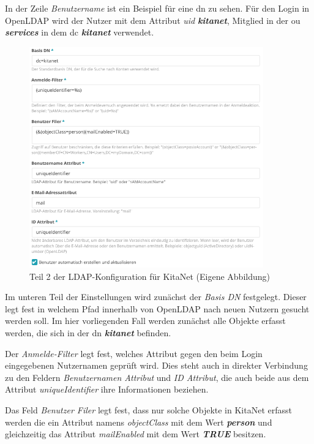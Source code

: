In der Zeile \textit{Benutzername} ist ein Beispiel für eine \ac{dn} zu sehen. Für den Login in OpenLDAP wird der Nutzer mit dem Attribut \textit{uid} \textbf{\textit{kitanet}}, Mitglied in der \ac{ou} \textbf{\textit{services}} in dem \ac{dc} \textbf{\textit{kitanet}} verwendet.

\begin{figure}[H]
  \centering
  \includegraphics[width=0.9\textwidth]{res/ldapkitanet2.png}
  \caption{Teil 2 der LDAP-Konfiguration für KitaNet (Eigene Abbildung)}
  \label{fig:LDAP KitaNet Teil 2}
\end{figure}

Im unteren Teil der Einstellungen wird zunächst der \textit{Basis DN} festgelegt. Dieser legt fest in welchem Pfad innerhalb von OpenLDAP nach neuen Nutzern gesucht werden soll. Im hier vorliegenden Fall werden zunächst alle Objekte erfasst werden, die sich in der \ac{dn} \textbf{\textit{kitanet}} befinden.

Der \textit{Anmelde-Filter} legt fest, welches Attribut gegen den beim Login eingegebenen Nutzernamen geprüft wird. 
Dies steht auch in direkter Verbindung zu den Feldern \textit{Benutzernamen Attribut} und \textit{ID Attribut}, die auch beide aus dem Attribut \textit{uniqueIdentifier} ihre Informationen beziehen. 

Das Feld \textit{Benutzer Filer} legt fest, dass nur solche Objekte in KitaNet erfasst werden die ein Attribut namens \textit{objectClass} mit dem Wert \textbf{\textit{person}} und gleichzeitig das Attribut \textit{mailEnabled} mit dem Wert \textbf{\textit{TRUE}} besitzen.

